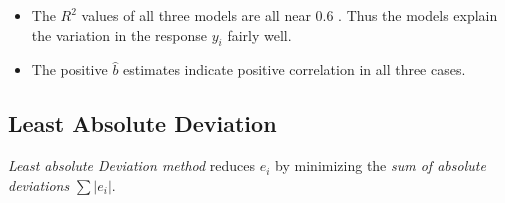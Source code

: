 \documentclass[
]{article}
\providecommand{\tightlist}{%
  \setlength{\itemsep}{0pt}\setlength{\parskip}{0pt}}\usepackage{longtable,booktabs,array}
\begin{document}
\begin{itemize}
\tightlist
\item
  The \(R^2\) values of all three models are all near 0.6 . Thus the
  models explain the variation in the response \(y_i\) fairly well.
\item
  The positive \(\hat{b}\) estimates indicate positive correlation in
  all three cases.
\end{itemize}

\hypertarget{least-absolute-deviation}{%
\subsection{Least Absolute Deviation}\label{least-absolute-deviation}}

\emph{Least absolute Deviation method} reduces \(e_i\) by minimizing the
\emph{sum of absolute deviations} \(\sum{|e_i|}\).
\end{document}
